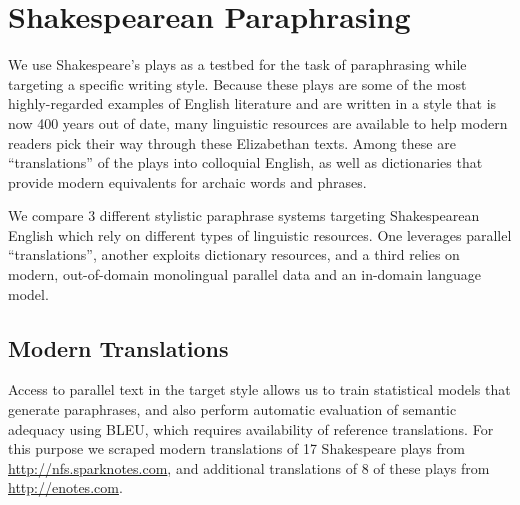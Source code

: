 \documentclass[10pt,a5paper,twoside]{article}
\begin{document}

\section{Shakespearean Paraphrasing}
We use Shakespeare's plays as a testbed for the task of paraphrasing while targeting a specific writing style.  Because these plays are some of 
the most highly-regarded examples of English literature and 
are written in a style that is now 400 years out of date, many linguistic resources are available to help modern readers pick their way through 
these Elizabethan texts. Among these are “translations” of the plays into colloquial English, as well as dictionaries that provide modern equivalents for archaic words and phrases.

We compare 3 different stylistic paraphrase systems targeting Shakespearean English which rely on different types of linguistic resources. 
One leverages parallel “translations”, another exploits dictionary resources, and a third relies on modern, out-of-domain monolingual parallel data and an in-domain language model.

\subsection{Modern Translations}
\label{modern_translations}
Access to parallel text in the target style allows us to train statistical models that generate paraphrases, and also perform automatic evaluation of semantic adequacy using BLEU, which requires availability of reference translations.  For this purpose we scraped modern translations of 17 Shakespeare plays from \url{http://nfs.sparknotes.com}, and 
additional translations of 8 of these plays from \url{http://enotes.com}.
\end{document}
